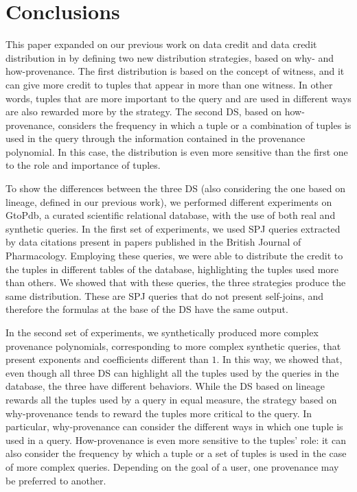 \section{Conclusions}
\label{section:conclusions}

This paper expanded on our previous work on data credit and data credit distribution in \cite{dosso2020data} by defining two new distribution strategies, based on why- and how-provenance. 
The first distribution is based on the concept of witness, and it can give more credit to tuples that appear in more than one witness. 
In other words, tuples that are more important to the query and are used in different ways are also rewarded more by the strategy.
The second DS, based on how-provenance, considers the frequency in which a tuple or a combination of tuples is used in the query through the information contained in the provenance polynomial. In this case, the distribution is even more sensitive than the first one to the role and importance of tuples.

To show the differences between the three DS (also considering the one based on lineage, defined in our previous work), we performed different experiments on GtoPdb, a curated scientific relational database, with the use of both real and synthetic queries. 
In the first set of experiments, we used SPJ queries extracted by data citations present in papers published in the British Journal of Pharmacology. 
Employing these queries, we were able to distribute the credit to the tuples in different tables of the database, highlighting the tuples used more than others. 
We showed that with these queries, the three strategies produce the same distribution. These are SPJ queries that do not present self-joins, and therefore the formulas at the base of the DS have the same output.

In the second set of experiments, we synthetically produced more complex provenance polynomials, corresponding to more complex synthetic queries, that present exponents and coefficients different than $1$.
In this way, we showed that, even though all three DS can highlight all the tuples used by the queries in the database, the three have different behaviors. 
While the DS based on lineage rewards all the tuples used by a query in equal measure, the strategy based on why-provenance tends to reward the tuples more critical to the query. 
In particular, why-provenance can consider the different ways in which one tuple is used in a query.  
How-provenance is even more sensitive to the tuples' role: it can also consider the frequency by which a tuple or a set of tuples is used in the case of more complex queries. Depending on the goal of a user, one provenance may be preferred to another. 

